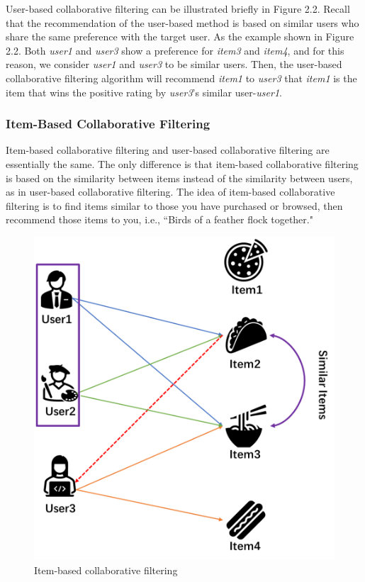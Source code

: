 User-based collaborative filtering can be illustrated briefly in Figure 2.2. Recall that the recommendation of the user-based method is based on similar users who share the same preference with the target user. As the example shown in Figure 2.2. Both \textit{user1} and \textit{user3} show a preference for \textit{item3} and \textit{item4}, and for this reason, we consider \textit{user1} and \textit{user3} to be similar users. Then, the user-based collaborative filtering algorithm will recommend \textit{item1} to \textit{user3} that \textit{item1} is the item that wins the positive rating by \textit{user3}’s similar user-\textit{user1}.

\subsubsection{Item-Based Collaborative Filtering}
Item-based collaborative filtering and user-based collaborative filtering are essentially the same. The only difference is that item-based collaborative filtering is based on the similarity between items instead of the similarity between users, as in user-based collaborative filtering. The idea of item-based collaborative filtering is to find items similar to those you have purchased or browsed, then recommend those items to you, i.e., ``Birds of a feather flock together."
\begin{figure}[htbp]
\centering
\includegraphics[scale=0.5]{figure/model2.png}
\caption{Item-based collaborative filtering}
\end{figure}

